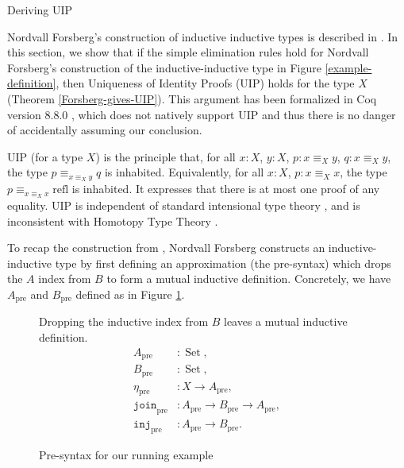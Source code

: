 \documentclass[acmsmall,review]{acmart}\settopmatter{printfolios=true,printccs=false,printacmref=false}
\DeclareMathOperator{\USet}{Set}
\newcommand{\pre}[1]{{#1}_\text{pre}}
\newcommand{\IdA}[3]{{#1}\equiv_{#3}{#2}}
\newcommand{\join}{\texttt{join}}
\newcommand{\inj}{\texttt{inj}}
\def\Forsberg/{Nordvall Forsberg}
\begin{document}
\begin{section}{Deriving UIP}\label{derivingUIP}

\Forsberg/'s construction of inductive inductive types is described in \citet[\S5.3]{nordvallforsberg2013thesis}. In this section, we show that if the simple elimination rules hold for \Forsberg/'s construction of the inductive-inductive type in Figure \ref{example-definition}, then Uniqueness of Identity Proofs (UIP) holds for the type $X$ (Theorem \ref{Forsberg-gives-UIP}).
This argument has been formalized in Coq version 8.8.0 \citep{Coq880}, which does not natively support UIP and thus there is no danger of accidentally assuming our conclusion.

UIP (for a type $X$) is the principle that, for all $x : X$, $y : X$, $p : \IdA{x}{y}{X}$, $q : \IdA{x}{y}{X}$, the type $\IdA{p}{q}{\IdA{x}{y}{X}}$ is inhabited. Equivalently, for all $x : X$, $p : \IdA{x}{x}{X}$, the type $\IdA{p}{\text{refl}}{\IdA{x}{x}{X}}$ is inhabited. It expresses that there is at most one proof of any equality. UIP is independent of standard intensional type theory \citep{groupoidmodel}, and is inconsistent with Homotopy Type Theory \citep{hottbook}.

To recap the construction from \citet[\S5.3]{nordvallforsberg2013thesis}, \Forsberg/ constructs an inductive-inductive type by first defining an approximation (the pre-syntax) which drops the $A$ index from $B$ to form a mutual inductive definition. Concretely, we have $\pre{A}$ and $\pre{B}$ defined as in Figure \ref{example-pre-syntax}.

\begin{figure}[htpb]
    \begin{flushleft}
        Dropping the inductive index from $B$ leaves a mutual inductive definition.
        \begin{align*}
        \pre{A}&:\USet,\\
        \pre{B}&:\USet,\\
        \pre{\eta}&:X\to\pre{A},\\
        \pre{\join}&:\pre{A}\to\pre{B}\to\pre{A},\\
        \pre{\inj}&:\pre{A}\to\pre{B}.
        \end{align*}
    \end{flushleft}
    
    \caption{\label{example-pre-syntax}Pre-syntax for our running example}
\end{figure}


\end{section}
\end{document}
